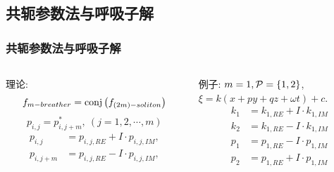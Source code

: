 \subsection{共轭参数法与呼吸子解}
\begin{frame}
\frametitle{共轭参数法与呼吸子解}
\begin{columns}
\begin{column}{0.5\textwidth}
理论:
\[
    f_{m-breather}={\rm conj}\left(f_{(2m)-soliton}\right) 
\]
\[
    p_{i,j}=p_{i,j+m}^*,~(j=1,2,\cdots,m)
\]
\[
\begin{split}
    p_{i,j}&=p_{i,j,RE}+I\cdot p_{i,j,IM}, \\ 
    p_{i,j+m}&=p_{i,j,RE}-I\cdot p_{i,j,IM},
\end{split}
\]
\end{column}
\begin{column}{0.5\textwidth}
例子: $m=1,\mathcal{P}=\left\{1,2\right\}$,\\$\xi=k(x+py+qz+\omega t)+c$.
\[
\begin{split}
    k_1&=k_{1,RE}+I\cdot k_{1,IM} \\ 
    k_2&=k_{1,RE}-I\cdot k_{1,IM} \\
    p_1&=p_{1,RE}-I\cdot p_{1,IM} \\
    p_2&=p_{1,RE}+I\cdot p_{1,IM} \\ 
\end{split} 
\]
\end{column}
\end{columns}
\end{frame}

